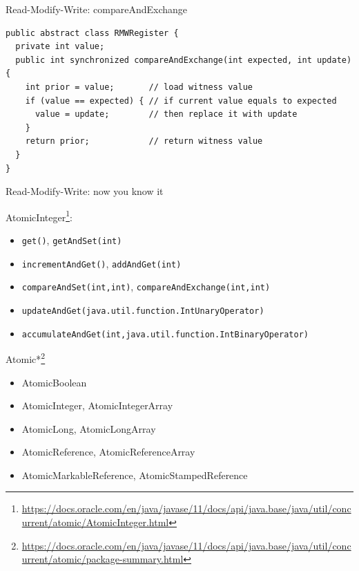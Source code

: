\begin{frame}{Read-Modify-Write: compareAndExchange}

\begin{verbatim}
public abstract class RMWRegister {
  private int value;
  public int synchronized compareAndExchange(int expected, int update) {
    int prior = value;       // load witness value
    if (value == expected) { // if current value equals to expected
      value = update;        // then replace it with update      
    }
    return prior;            // return witness value
  }
}
\end{verbatim}
\end{frame}


\begin{frame}[fragile]{Read-Modify-Write: now you know it}

AtomicInteger\footnote{\tiny\url{https://docs.oracle.com/en/java/javase/11/docs/api/java.base/java/util/concurrent/atomic/AtomicInteger.html}}:
\pause
\begin{itemize}
  \item \texttt{get()}, \texttt{getAndSet(int)}
  \pause
  \item \texttt{incrementAndGet()}, \texttt{addAndGet(int)}
  \pause
  \item \texttt{compareAndSet(int,int)}, \texttt{compareAndExchange(int,int)}
  \pause
  \item \texttt{updateAndGet(java.util.function.IntUnaryOperator)}
  \item \texttt{accumulateAndGet(int,java.util.function.IntBinaryOperator)}  
\end{itemize}

\pause
Atomic*\footnote<6->{\tiny\url{https://docs.oracle.com/en/java/javase/11/docs/api/java.base/java/util/concurrent/atomic/package-summary.html}}

\begin{itemize}
  \item AtomicBoolean
  \item AtomicInteger, AtomicIntegerArray
  \item AtomicLong, AtomicLongArray
  \item AtomicReference, AtomicReferenceArray
  \pause
  \item AtomicMarkableReference, AtomicStampedReference
\end{itemize}

\end{frame}


